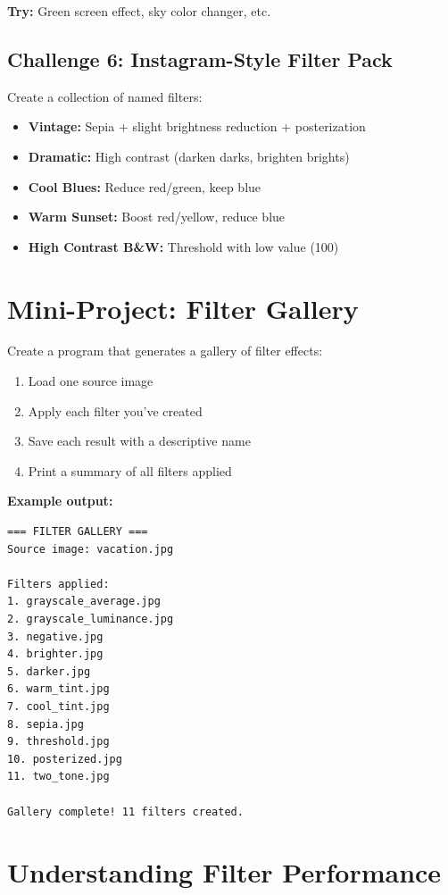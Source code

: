 \documentclass[11pt]{article}
\begin{document}
\textbf{Try:} Green screen effect, sky color changer, etc.

\subsection*{Challenge 6: Instagram-Style Filter Pack}

Create a collection of named filters:

\begin{itemize}
    \item \textbf{Vintage:} Sepia + slight brightness reduction + posterization
    \item \textbf{Dramatic:} High contrast (darken darks, brighten brights)
    \item \textbf{Cool Blues:} Reduce red/green, keep blue
    \item \textbf{Warm Sunset:} Boost red/yellow, reduce blue
    \item \textbf{High Contrast B\&W:} Threshold with low value (100)
\end{itemize}

\section{Mini-Project: Filter Gallery}

Create a program that generates a gallery of filter effects:

\begin{enumerate}
    \item Load one source image
    \item Apply each filter you've created
    \item Save each result with a descriptive name
    \item Print a summary of all filters applied
\end{enumerate}

\textbf{Example output:}
\begin{verbatim}
=== FILTER GALLERY ===
Source image: vacation.jpg

Filters applied:
1. grayscale_average.jpg
2. grayscale_luminance.jpg
3. negative.jpg
4. brighter.jpg
5. darker.jpg
6. warm_tint.jpg
7. cool_tint.jpg
8. sepia.jpg
9. threshold.jpg
10. posterized.jpg
11. two_tone.jpg

Gallery complete! 11 filters created.
\end{verbatim}

\section*{Understanding Filter Performance}
\end{document}
